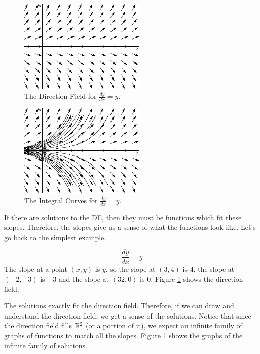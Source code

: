 \documentclass[fleqn,letterpaper]{report}
\begin{document}
\begin{figure}[t]
\centering
\includegraphics[width=6cm]{figure06.eps}
\caption{The Direction Field for $\frac{dy}{dx} = y$.}
\label{figure-direction-field1}
\end{figure}

\begin{figure}[t]
\centering
\includegraphics[width=6cm]{figure07.eps}
\caption{The Integral Curves for $\frac{dy}{dx} = y$.}
\label{figure-direction-field1-curves}
\end{figure}

If there are solutions to the DE, then they must be functions
which fit these slopes. Therefore, the slopes give us a sense
of what the functions look like. Let's go back to the
simplest example.

\begin{example}
\begin{equation*}
\frac{dy}{dx} = y
\end{equation*}
The slope at a point $(x,y)$ is $y$, so the slope at $(3,4)$
is $4$, the slope at $(-2,-3)$ is $-3$ and the slope at
$(32,0)$ is $0$. Figure \ref{figure-direction-field1} shows the
direction field.

The solutions exactly fit the direction field.
Therefore, if we can draw and understand the direction field,
we get a sense of the solutions. Notice that since the
direction field fills $\mathbb{R}^2$ (or a portion of it), we expect
an infinite family of graphs of functions to match all the
slopes. Figure \ref{figure-direction-field1} shows the
graphs of the infinite family of solutions.
\end{example}
\end{document}
